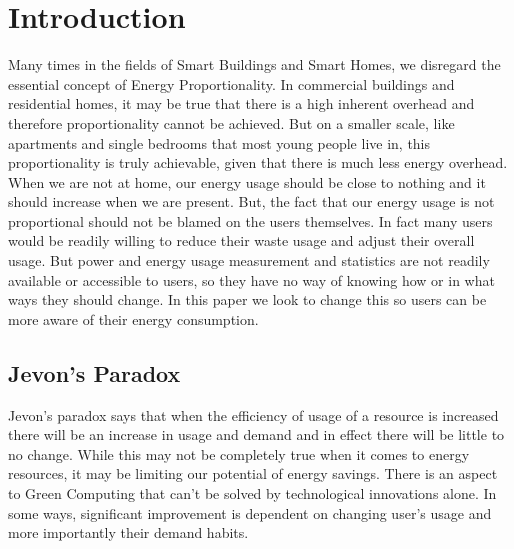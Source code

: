 \documentclass{sig-alternate-05-2015}
\begin{document}


%
%

%
%
\printccsdesc



\section{Introduction}
Many times in the fields of Smart Buildings and Smart Homes, we disregard the essential concept of Energy Proportionality. In commercial buildings and residential homes, it may be true that there is a high inherent overhead and therefore proportionality cannot be achieved. But on a smaller scale, like apartments and single bedrooms that most young people live in, this proportionality is truly achievable, given that there is much less energy overhead. When we are not at home, our energy usage should be close to nothing and it should increase when we are present. But, the fact that our energy usage is not proportional should not be blamed on the users themselves. In fact many users would be readily willing to reduce their waste usage and adjust their overall usage. But power and energy usage measurement and statistics are not readily available or accessible to users, so they have no way of knowing how or in what ways they should change. In this paper we look to change this so users can be more aware of their energy consumption.

\subsection{Jevon's Paradox}
Jevon’s paradox says that when the efficiency of usage of a resource is increased there will be an increase in usage and demand and in effect there will be little to no change. While this may not be completely true when it comes to energy resources, it may be limiting our potential of energy savings. There is an aspect to Green Computing that can’t be solved by technological innovations alone. In some ways, significant improvement is dependent on changing user's usage and more importantly their demand habits. 
\end{document}
